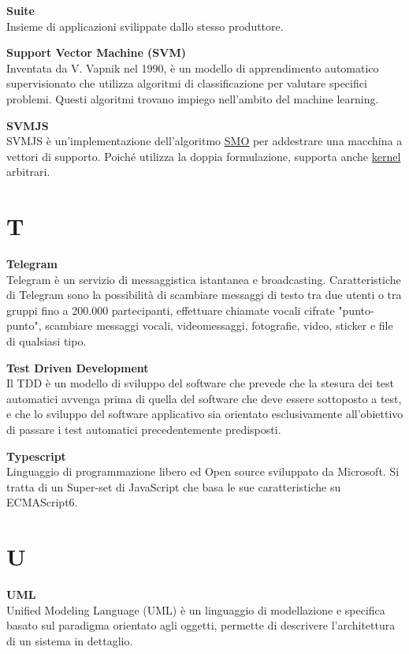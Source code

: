 \documentclass[a4paper, oneside, openany, dvipsnames, table, 12pt]{article}
\begin{document}
\textbf{Suite} \\
Insieme di applicazioni svilippate dallo stesso produttore.

\textbf{Support Vector Machine (SVM)} \\
Inventata da V. Vapnik nel 1990, è un modello di apprendimento automatico supervisionato che utilizza algoritmi di classificazione per valutare specifici problemi. Questi algoritmi trovano impiego nell'ambito del machine learning.

\textbf{SVMJS} \\
SVMJS è un'implementazione dell'algoritmo \hyperref[par:SMO]{SMO\glo} per addestrare una macchina a vettori di supporto. Poiché utilizza la doppia formulazione, supporta anche \hyperref[par:kernel]{kernel\glo} arbitrari. 

\newpage
\section{T}
\textbf{Telegram} \\
Telegram è un servizio di messaggistica istantanea e broadcasting. Caratteristiche di Telegram sono la possibilità di scambiare messaggi di testo tra due utenti o tra gruppi fino a 200.000 partecipanti, effettuare chiamate vocali cifrate "punto-punto", scambiare messaggi vocali, videomessaggi, fotografie, video, sticker e file di qualsiasi tipo.

\label{par:tdd}
\textbf{Test Driven Development} \\
Il TDD è un modello di sviluppo del software che prevede che la stesura dei test automatici avvenga prima di quella del software che deve essere sottoposto a test, e che lo sviluppo del software applicativo sia orientato esclusivamente all'obiettivo di passare i test automatici precedentemente predisposti.

\textbf{Typescript} \\
Linguaggio di programmazione libero ed Open source sviluppato da Microsoft. Si tratta di un Super-set di JavaScript che basa le sue caratteristiche su ECMAScript6.

\newpage
\section{U}
\textbf{UML} \\
Unified Modeling Language (UML) è un linguaggio di modellazione e specifica basato sul paradigma orientato agli oggetti, permette di descrivere l’architettura di un sistema in dettaglio. 
\end{document}
